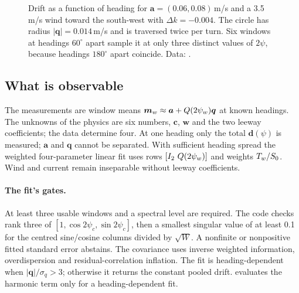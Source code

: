 \begin{figure}[ht]
\centering
{}
\caption{Drift as a function of heading for $\bm a = (0.06, 0.08)$\,m/s and a
3.5\,m/s wind toward the south-west with $\Delta k = -0.004$. The circle has
radius $|\bm q| = 0.014$\,m/s and is traversed twice per turn. Six windows at
headings $60^\circ$ apart sample it at only three distinct values of $2\psi$,
because headings $180^\circ$ apart coincide. Data:
.}
\label{fig:cond-windage}
\end{figure}

\subsection{What is observable}

The measurements are window means $\bm m_w \approx \bm a + Q(2\psi_w)\bm q$ at known
headings. The unknowns of the physics are six numbers, $\bm c$, $\bm w$ and the
two leeway coefficients; the data determine four.
At one heading only the total $\bm d(\psi)$ is measured; $\bm a$ and
$\bm q$ cannot be separated. With sufficient heading spread the weighted
four-parameter linear fit uses rows $[I_2\ \Qm{2\psi_w}]$ and weights $T_w/S_0$.
Wind and current remain inseparable without leeway coefficients.

\paragraph{The fit's gates.} At least three usable windows and a spectral level
are required. The code checks rank three of $[1,\cos2\psi_c,\sin2\psi_c]$,
then a smallest singular value of at least 0.1 for the centred sine/cosine
columns divided by $\sqrt W$. A nonfinite or nonpositive fitted standard error
abstains. The covariance uses inverse weighted information, overdispersion
and residual-correlation inflation. The fit is heading-dependent when
$|\bm q|/\sigma_q>3$; otherwise it returns the constant pooled drift.
 evaluates the harmonic term only for a heading-dependent fit.

